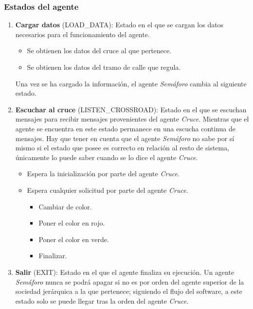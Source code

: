 \subsubsection{Estados del agente}
\begin{enumerate}
    \item \textbf{Cargar datos} \footnotesize(LOAD\_DATA)\normalsize: Estado en el que se cargan los datos necesarios para el funcionamiento del agente.
    \begin{itemize}
        \item Se obtienen los datos del cruce al que pertenece.
        \item Se obtienen los datos del tramo de calle que regula.
    \end{itemize}
    Una vez se ha cargado la información, el agente \textit{Semáforo} cambia al siguiente estado.
    \item \textbf{Escuchar al cruce} \footnotesize(LISTEN\_CROSSROAD)\normalsize: Estado en el que se escuchan mensajes para recibir mensajes provenientes del agente \textit{Cruce}. Mientras que el agente se encuentra en este estado permanece en una escucha continua de mensajes. Hay que tener en cuenta que el agente \textit{Semáforo} no sabe por sí mismo si el estado que posee es correcto en relación al resto de sistema, únicamente lo puede saber cuando se lo dice el agente \textit{Cruce}.
    \begin{itemize}
        \item Espera la inicialización por parte del agente \textit{Cruce}.
        \item Espera cualquier solicitud por parte del agente \textit{Cruce}.
            \begin{itemize}
                \item Cambiar de color.
                \item Poner el color en rojo.
                \item Poner el color en verde.
                \item Finalizar.
            \end{itemize}
    \end{itemize}
    \item \textbf{Salir} \footnotesize(EXIT)\normalsize: Estado en el que el agente finaliza su ejecución. Un agente \textit{Semáforo} nunca se podrá apagar si no es por orden del agente superior de la sociedad jerárquica a la que pertenece; siguiendo el flujo del software, a este estado solo se puede llegar tras la orden del agente \textit{Cruce}.
\end{enumerate}

